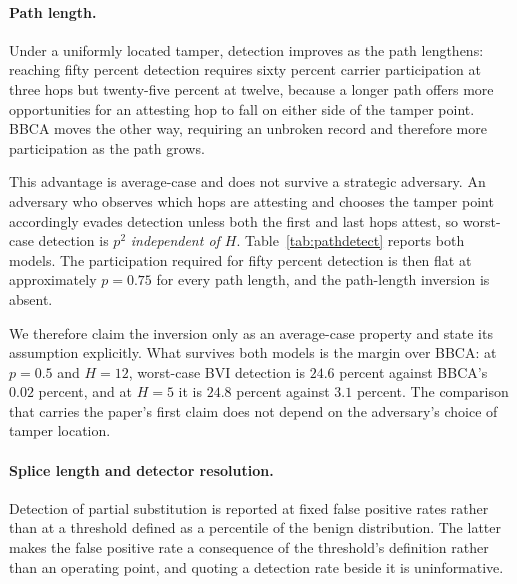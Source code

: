 %

\paragraph{Path length.}
Under a uniformly located tamper, detection improves as the path lengthens:
reaching fifty percent detection requires sixty percent carrier participation at
three hops but twenty-five percent at twelve, because a longer path offers more
opportunities for an attesting hop to fall on either side of the tamper point.
BBCA moves the other way, requiring an unbroken record and therefore more
participation as the path grows.

This advantage is average-case and does not survive a strategic adversary. An
adversary who observes which hops are attesting and chooses the tamper point
accordingly evades detection unless both the first and last hops attest, so
worst-case detection is $p^2$ \emph{independent of $H$}. Table~\ref{tab:pathdetect}
reports both models. The participation required for fifty percent detection is
then flat at approximately $p=0.75$ for every path length, and the path-length
inversion is absent.

We therefore claim the inversion only as an average-case property and state its
assumption explicitly. What survives both models is the margin over BBCA: at
$p=0.5$ and $H=12$, worst-case BVI detection is $24.6$ percent against BBCA's
$0.02$ percent, and at $H=5$ it is $24.8$ percent against $3.1$ percent. The
comparison that carries the paper's first claim does not depend on the
adversary's choice of tamper location.


%

\paragraph{Splice length and detector resolution.}
Detection of partial substitution is reported at fixed false positive rates
rather than at a threshold defined as a percentile of the benign distribution.
The latter makes the false positive rate a consequence of the threshold's
definition rather than an operating point, and quoting a detection rate beside
it is uninformative.

